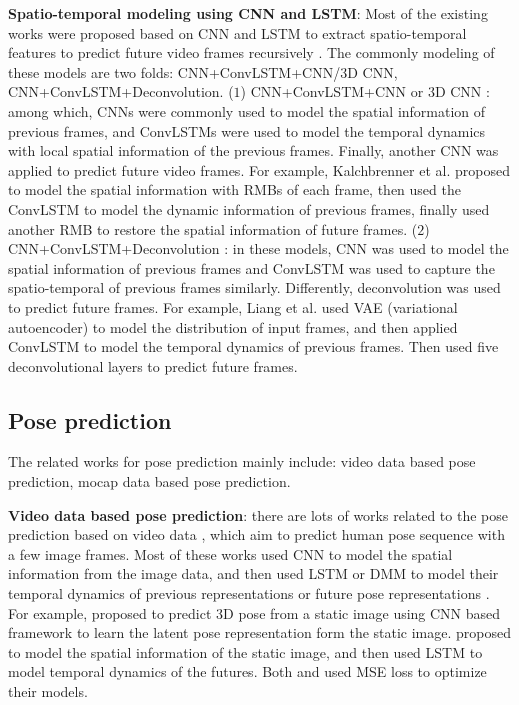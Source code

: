 \documentclass[journal]{IEEEtran}
\begin{document}
{\bf Spatio-temporal modeling using CNN and LSTM}: Most of the existing works were proposed based on CNN and LSTM to extract spatio-temporal features to predict future video frames recursively \cite{acvpag,dmf2vp,savp,sv2p,fstvp,spvp,dgvp,dpcvpul,vpn,ld2rvp,dmcnvsp}. The commonly modeling of these models are two folds: CNN+ConvLSTM+CNN/${3}$D CNN, CNN+ConvLSTM+Deconvolution. (${1}$) CNN+ConvLSTM+CNN or ${3}$D CNN \cite{savp,sv2p,fstvp,spvp,dgvp,dpcvpul,vpn}: among which, CNNs were commonly used to model the spatial information of previous frames, and ConvLSTMs were used to model the temporal dynamics with local spatial information of the previous frames. Finally, another CNN was applied to predict future video frames. For example, Kalchbrenner et al. \cite{vpn} proposed to model the spatial information with RMBs  of each frame, then used the ConvLSTM to model the dynamic information of previous frames, finally used another RMB to restore the spatial information of future frames. (${2}$) CNN+ConvLSTM+Deconvolution \cite{acvpag,dmf2vp,ld2rvp,dmcnvsp}: in these models, CNN was used to model the spatial information of previous frames and ConvLSTM was used to capture the spatio-temporal of previous frames similarly. Differently, deconvolution was used to predict future frames. For example, Liang et al. \cite{dmf2vp} used VAE (variational autoencoder) to model the distribution of input frames, and then applied ConvLSTM to model the temporal dynamics of previous frames. Then used five deconvolutional layers to predict future frames.


\subsection{Pose prediction}

The related works for pose prediction mainly include: video data based pose prediction, mocap data based pose prediction.

{\bf Video data based pose prediction}: there are lots of works related to the pose prediction based on video data \cite{CaiDVG,pkvf,pfdmm,PFN3D,sp2dnn,mdmfp,rmpof}, which aim to predict human pose sequence with a few image frames. Most of these works used CNN to model the spatial information from the image data, and then used LSTM or DMM to model their temporal dynamics of previous representations or future pose representations \cite{pkvf,pfdmm,PFN3D,rmpof}. For example, \cite{sp2dnn} proposed to predict 3D pose from a static image using CNN based framework to learn the latent pose representation form the static image. \cite{PFN3D} proposed to model the spatial information of the static image, and then used LSTM to model temporal dynamics of the futures. Both \cite{PFN3D} and \cite{sp2dnn} used MSE loss to optimize their models.
\end{document}
